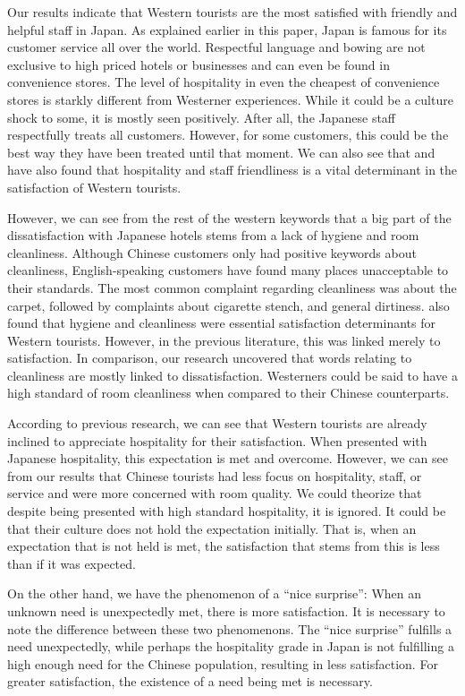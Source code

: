 \documentclass[smallextended,natbib]{svjour3}       %
\begin{document}
    Our results indicate that Western tourists are the most satisfied with friendly and helpful staff in Japan. As explained earlier in this paper, Japan is famous for its customer service all over the world. Respectful language and bowing are not exclusive to high priced hotels or businesses and can even be found in convenience stores. The level of hospitality in even the cheapest of convenience stores is starkly different from Westerner experiences. While it could be a culture shock to some, it is mostly seen positively. After all, the Japanese staff respectfully treats all customers. However, for some customers, this could be the best way they have been treated until that moment. We can also see that \cite{kozak2002} and \cite{shanka2004} have also found that hospitality and staff friendliness is a vital determinant in the satisfaction of Western tourists. 

    However, we can see from the rest of the western keywords that a big part of the dissatisfaction with Japanese hotels stems from a lack of hygiene and room cleanliness. Although Chinese customers only had positive keywords about cleanliness, English-speaking customers have found many places unacceptable to their standards. The most common complaint regarding cleanliness was about the carpet, followed by complaints about cigarette stench, and general dirtiness. \cite{kozak2002} also found that hygiene and cleanliness were essential satisfaction determinants for Western tourists. However, in the previous literature, this was linked merely to satisfaction. In comparison, our research uncovered that words relating to cleanliness are mostly linked to dissatisfaction. Westerners could be said to have a high standard of room cleanliness when compared to their Chinese counterparts. 

    According to previous research, we can see that Western tourists are already inclined to appreciate hospitality for their satisfaction. When presented with Japanese hospitality, this expectation is met and overcome. However, we can see from our results that Chinese tourists had less focus on hospitality, staff, or service and were more concerned with room quality. We could theorize that despite being presented with high standard hospitality, it is ignored. It could be that their culture does not hold the expectation initially. That is, when an expectation that is not held is met, the satisfaction that stems from this is less than if it was expected.

    On the other hand, we have the phenomenon of a ``nice surprise'': When an unknown need is unexpectedly met, there is more satisfaction. It is necessary to note the difference between these two phenomenons. The ``nice surprise'' fulfills a need unexpectedly, while perhaps the hospitality grade in Japan is not fulfilling a high enough need for the Chinese population, resulting in less satisfaction. For greater satisfaction, the existence of a need being met is necessary. 
\end{document}
